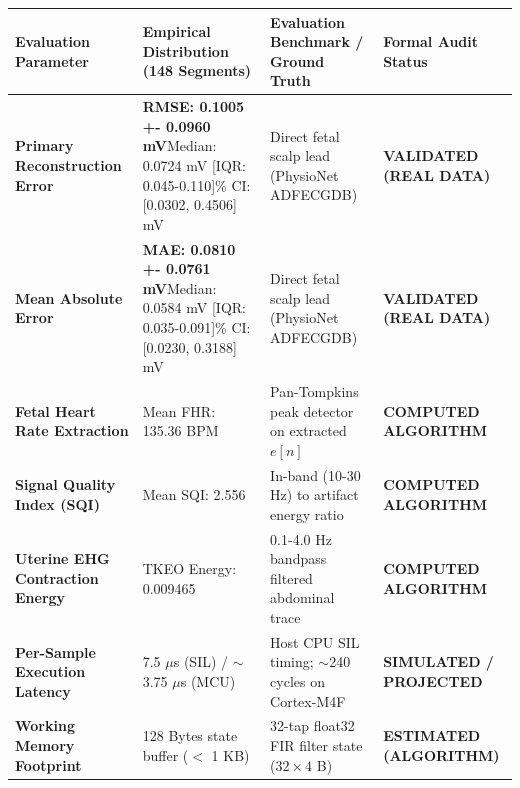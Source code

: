 \documentclass[10pt,a4paper]{article}
\begin{document}
\noindent
\begin{tabularx}{\textwidth}{lXXl}
\toprule
\textbf{Evaluation Parameter} & \textbf{Empirical Distribution (148 Segments)} & \textbf{Evaluation Benchmark / Ground Truth} & \textbf{Formal Audit Status} \\
\midrule
\textbf{Primary Reconstruction Error} & \textbf{RMSE: 0.1005 +- 0.0960 mV}\newline Median: 0.0724 mV [IQR: 0.045-0.110]\newline 95\% CI: [0.0302, 0.4506] mV & Direct fetal scalp lead (PhysioNet ADFECGDB) & \textbf{VALIDATED (REAL DATA)} \\
\addlinespace
\textbf{Mean Absolute Error} & \textbf{MAE: 0.0810 +- 0.0761 mV}\newline Median: 0.0584 mV [IQR: 0.035-0.091]\newline 95\% CI: [0.0230, 0.3188] mV & Direct fetal scalp lead (PhysioNet ADFECGDB) & \textbf{VALIDATED (REAL DATA)} \\
\addlinespace
\textbf{Fetal Heart Rate Extraction} & Mean FHR: 135.36 BPM & Pan-Tompkins peak detector on extracted $e[n]$ & \textbf{COMPUTED ALGORITHM} \\
\addlinespace
\textbf{Signal Quality Index (SQI)} & Mean SQI: 2.556 & In-band (10-30 Hz) to artifact energy ratio & \textbf{COMPUTED ALGORITHM} \\
\addlinespace
\textbf{Uterine EHG Contraction Energy} & TKEO Energy: 0.009465 & 0.1-4.0 Hz bandpass filtered abdominal trace & \textbf{COMPUTED ALGORITHM} \\
\addlinespace
\textbf{Per-Sample Execution Latency} & 7.5 $\mu$s (SIL) / $\sim$3.75 $\mu$s (MCU) & Host CPU SIL timing; $\sim$240 cycles on Cortex-M4F & \textbf{SIMULATED / PROJECTED} \\
\addlinespace
\textbf{Working Memory Footprint} & 128 Bytes state buffer ($<$ 1 KB) & 32-tap float32 FIR filter state ($32 \times 4$ B) & \textbf{ESTIMATED (ALGORITHM)} \\
\bottomrule
\end{tabularx}

\vspace{0.4em}
\noindent
{}
\end{document}
